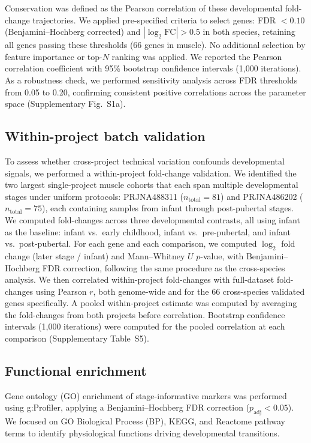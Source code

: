 \documentclass[10pt,a4paper]{article}
\begin{document}
Conservation was defined as the Pearson correlation of these developmental fold-change trajectories. We applied pre-specified criteria to select genes: FDR $< 0.10$ (Benjamini--Hochberg corrected) and $|\log_2\mathrm{FC}| > 0.5$ in both species, retaining all genes passing these thresholds (66 genes in muscle). No additional selection by feature importance or top-$N$ ranking was applied. We reported the Pearson correlation coefficient with 95\% bootstrap confidence intervals (1,000 iterations). As a robustness check, we performed sensitivity analysis across FDR thresholds from 0.05 to 0.20, confirming consistent positive correlations across the parameter space (Supplementary Fig.~S1a).

\subsection{Within-project batch validation}

To assess whether cross-project technical variation confounds developmental signals, we performed a within-project fold-change validation. We identified the two largest single-project muscle cohorts that each span multiple developmental stages under uniform protocols: PRJNA488311 ($n_{\text{total}} = 81$) and PRJNA486202 ($n_{\text{total}} = 75$), each containing samples from infant through post-pubertal stages. We computed fold-changes across three developmental contrasts, all using infant as the baseline: infant vs.\ early childhood, infant vs.\ pre-pubertal, and infant vs.\ post-pubertal. For each gene and each comparison, we computed $\log_2$ fold change (later stage / infant) and Mann--Whitney $U$ $p$-value, with Benjamini--Hochberg FDR correction, following the same procedure as the cross-species analysis. We then correlated within-project fold-changes with full-dataset fold-changes using Pearson $r$, both genome-wide and for the 66 cross-species validated genes specifically. A pooled within-project estimate was computed by averaging the fold-changes from both projects before correlation. Bootstrap confidence intervals (1,000 iterations) were computed for the pooled correlation at each comparison (Supplementary Table~S5).

\subsection{Functional enrichment}

Gene ontology (GO) enrichment of stage-informative markers was performed using g:Profiler\cite{kolberg_gprofiler-interoperable_2023}, applying a Benjamini--Hochberg FDR correction ($p_{\mathrm{adj}} < 0.05$). We focused on GO Biological Process (BP), KEGG, and Reactome pathway terms to identify physiological functions driving developmental transitions.
\end{document}
